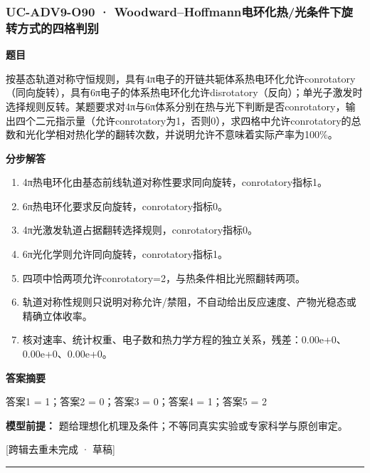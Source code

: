 \documentclass[UTF8,11pt,a4paper]{ctexart}
\begin{document}
\subsubsection*{UC-ADV9-O90 · Woodward–Hoffmann电环化热/光条件下旋转方式的四格判别}
\noindent\textbf{题目}\par
按基态轨道对称守恒规则，具有4π电子的开链共轭体系热电环化允许conrotatory（同向旋转），具有6π电子的体系热电环化允许disrotatory（反向）；单光子激发时选择规则反转。某题要求对4π与6π体系分别在热与光下判断是否conrotatory，输出四个二元指示量（允许conrotatory为1，否则0），求四格中允许conrotatory的总数和光化学相对热化学的翻转次数，并说明允许不意味着实际产率为100\%。\par
\medskip\noindent\textbf{分步解答}
\begin{enumerate}
\item 4π热电环化由基态前线轨道对称性要求同向旋转，conrotatory指标1。
\item 6π热电环化要求反向旋转，conrotatory指标0。
\item 4π光激发轨道占据翻转选择规则，conrotatory指标0。
\item 6π光化学则允许同向旋转，conrotatory指标1。
\item 四项中恰两项允许conrotatory=2，与热条件相比光照翻转两项。
\item 轨道对称性规则只说明对称允许/禁阻，不自动给出反应速度、产物光稳态或精确立体收率。
\item 核对速率、统计权重、电子数和热力学方程的独立关系，残差：0.00e+0、0.00e+0、0.00e+0。
\end{enumerate}
\noindent\textbf{答案摘要}\par
答案1 = 1；答案2 = 0；答案3 = 0；答案4 = 1；答案5 = 2\par
\noindent\textbf{模型前提：}
题给理想化机理及条件；不等同真实实验或专家科学与原创审定。\par
\noindent\textcolor{red!65!black}{[跨辑去重未完成 · 草稿]} \par
\medskip\hrule\medskip
{}
\end{document}
